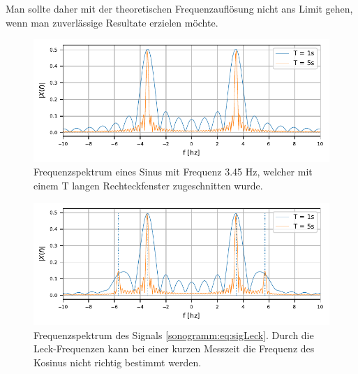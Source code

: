 Man sollte daher mit der theoretischen Frequenzauflösung nicht ans Limit gehen, wenn man
zuverlässige Resultate erzielen möchte.

\begin{figure}
    \centering
    \includegraphics{papers/sonogramm/images/RectWinHarmEx.pdf}
    \caption{Frequenzspektrum eines Sinus mit Frequenz 3.45 Hz, welcher mit einem T langen 
    Rechteckfenster zugeschnitten wurde.
    \label{sonogramm:leakageDemo}
    }
\end{figure}

\begin{figure}
    \centering
    \includegraphics{papers/sonogramm/images/twohamrrect.pdf}
    \caption{Frequenzspektrum des Signals \eqref{sonogramm:eq:sigLeck}.
    Durch die Leck-Frequenzen kann bei einer kurzen Messzeit die Frequenz des Kosinus 
    nicht richtig bestimmt werden.
    \label{sonogramm:leakageDemo2}
    }
\end{figure}

